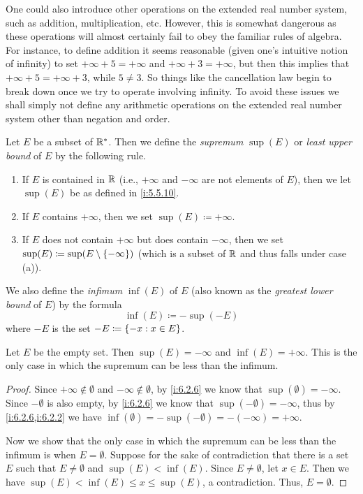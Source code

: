 \begin{note}
  One could also introduce other operations on the extended real number system, such as addition, multiplication, etc.
  However, this is somewhat dangerous as these operations will almost certainly fail to obey the familiar rules of algebra.
  For instance, to define addition it seems reasonable (given one's intuitive notion of infinity) to set \(+\infty + 5 = +\infty\) and \(+\infty + 3 = +\infty\), but then this implies that \(+\infty + 5 = +\infty + 3\), while \(5 \neq 3\).
  So things like the cancellation law begin to break down once we try to operate involving infinity.
  To avoid these issues we shall simply not define any arithmetic operations on the extended real number system other than negation and order.
\end{note}

\begin{defn}\label{i:6.2.6}
  Let \(E\) be a subset of \(\mathbb{R}^*\).
  Then we define the \emph{supremum} \(\sup(E)\) or \emph{least upper bound} of \(E\) by the following rule.
  \begin{enumerate}
    \item If \(E\) is contained in \(\mathbb{R}\) (i.e., \(+\infty\) and \(-\infty\) are not elements of \(E\)), then we let \(\sup(E)\) be as defined in \cref{i:5.5.10}.
    \item If \(E\) contains \(+\infty\), then we set \(\sup(E) \coloneqq +\infty\).
    \item If \(E\) does not contain \(+\infty\) but does contain \(-\infty\), then we set \(\sup(E) \coloneqq \sup(E \setminus \left\lbrace-\infty\right\rbrace)\)
          (which is a subset of \(\mathbb{R}\) and thus falls under case (a)).
  \end{enumerate}
  We also define the \emph{infimum} \(\inf(E)\) of \(E\) (also known as the \emph{greatest lower bound} of \(E\)) by the formula
  \[
    \inf(E) \coloneqq -\sup(-E)
  \]
  where \(-E\) is the set \(-E \coloneqq \left\lbrace-x : x \in E\right\rbrace\).
\end{defn}

\setcounter{thm}{9}
\begin{eg}\label{i:6.2.10}
  Let \(E\) be the empty set.
  Then \(\sup(E) = -\infty\) and \(\inf(E) = +\infty\).
  This is the only case in which the supremum can be less than the infimum.
\end{eg}

\begin{proof}
  Since \(+\infty \notin \emptyset\) and \(-\infty \notin \emptyset\), by \cref{i:6.2.6} we know that \(\sup(\emptyset) = -\infty\).
  Since \(-\emptyset\) is also empty, by \cref{i:6.2.6} we know that \(\sup(-\emptyset) = -\infty\), thus by \cref{i:6.2.6,i:6.2.2} we have \(\inf(\emptyset) = -\sup(-\emptyset) = -(-\infty) = +\infty\).

  Now we show that the only case in which the supremum can be less than the infimum is when \(E = \emptyset\).
  Suppose for the sake of contradiction that there is a set \(E\) such that \(E \neq \emptyset\) and \(\sup(E) < \inf(E)\).
  Since \(E \neq \emptyset\), let \(x \in E\).
  Then we have \(\sup(E) < \inf(E) \leq x \leq \sup(E)\), a contradiction.
  Thus, \(E = \emptyset\).
\end{proof}

